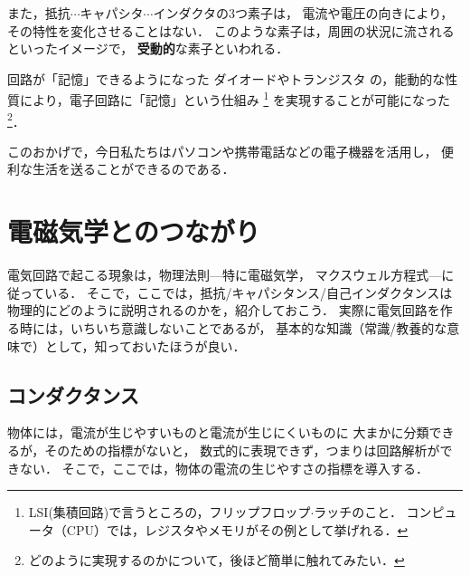         また，抵抗$\cdots$キャパシタ$\cdots$インダクタの3つ素子は，
        電流や電圧の向きにより，その特性を変化させることはない．
        このような素子は，周囲の状況に流されるといったイメージで，
        \textbf{受動的}な素子といわれる．

        \begin{memo}{回路が「記憶」できるようになった}
            ダイオードやトランジスタ
            の，能動的な性質により，電子回路に「記憶」という仕組み
                \footnote{
                    LSI(集積回路)で言うところの，フリップフロップ$\cdot$ラッチのこと．
                    コンピュータ（CPU）では，レジスタやメモリがその例として挙げれる．
                }
            を実現することが可能になった
                \footnote{
                    どのように実現するのかについて，後ほど簡単に触れてみたい．
                }．

            このおかげで，今日私たちはパソコンや携帯電話などの電子機器を活用し，
            便利な生活を送ることができるのである．
        \end{memo}

    \section{電磁気学とのつながり}
        \begin{mycomment}
            電気回路で起こる現象は，物理法則---特に電磁気学，
            マクスウェル方程式---に従っている．
            そこで，ここでは，抵抗/キャパシタンス/自己インダクタンスは
            物理的にどのように説明されるのかを，紹介しておこう．
            実際に電気回路を作る時には，いちいち意識しないことであるが，
            基本的な知識（常識/教養的な意味で）として，知っておいたほうが良い．
        \end{mycomment}

        \subsection{コンダクタンス}
        物体には，電流が生じやすいものと電流が生じにくいものに
        大まかに分類できるが，そのための指標がないと，
        数式的に表現できず，つまりは回路解析ができない．
        そこで，ここでは，物体の電流の生じやすさの指標を導入する．


